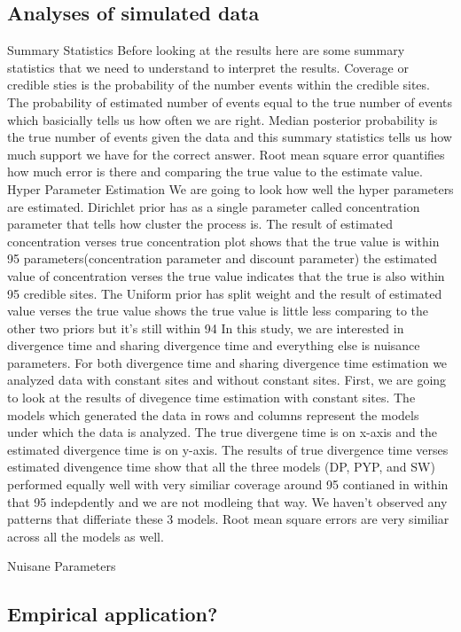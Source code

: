 \subsection{Analyses of simulated data}

Summary Statistics
Before looking at the results here are some summary statistics that we need to 
understand to interpret the results. Coverage or credible sties is the probability
of the number events within the credible sites. The probability of estimated number 
of events equal to the true number of events which basicially tells us how often we 
are right. Median posterior probability is the true number of events given the data 
and this summary statistics tells us how much support we have for the correct answer.
Root mean square error quantifies how much error is there and comparing the true 
value to the estimate value. 
Hyper Parameter Estimation 
We are going to look how well the hyper parameters are estimated. Dirichlet
prior has as a single parameter called concentration parameter that tells how cluster 
the process is. The result of estimated concentration verses true concentration plot
shows that the true value is within 95%
parameters(concentration parameter and discount parameter) the estimated value of 
concentration verses the true value indicates that the true is also within 95%
credible sites. The Uniform prior has split weight and the result of estimated value 
verses the true value shows the true value is little less comparing to the other two 
priors but it's still within 94%
In this study, we are interested in divergence time and sharing divergence time and 
everything else is nuisance parameters. For both divergence time and sharing divergence time 
estimation we analyzed data with constant sites and without constant sites. First, we are going 
to look at the results of divegence time estimation with constant sites. The models which generated 
the data in rows and columns represent the models under which the data is analyzed. The true divergene 
time is on x-axis and the estimated divergence time is on y-axis. The results of true divergence 
time verses estimated divengence time show that all the three models (DP, PYP, and SW) performed
equally well with very similiar coverage around 95%
contianed in within that 95%
indepdently and we are not modleing that way. We haven't observed any patterns that differiate
these 3 models. Root mean square errors are very similiar across all the models as well. 
 
  

 


    


Nuisane Parameters






\subsection{Empirical application?}
